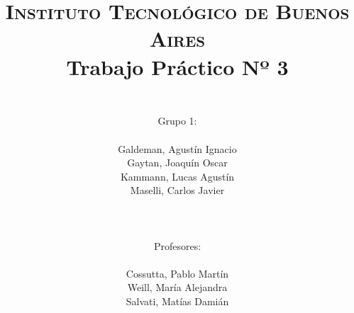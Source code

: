 



    \title{
        \normalfont \normalsize \textsc{Instituto Tecnol\'ogico de Buenos Aires} \\ [25pt]
        \huge Trabajo Pr\'actico Nº 3 \\
        \author{
            \\Grupo 1:\\\\Galdeman, Agust\'in Ignacio\\Gaytan, Joaqu\'in Oscar\\Kammann, Lucas Agust\'in\\Maselli, Carlos Javier\\ \\ \\ \\
            Profesores: \\\\ Cossutta, Pablo Mart\'in\\Weill, Mar\'ia Alejandra\\Salvati, Mat\'ias Dami\'an \\ \\ \\ 
        } 
    }

    \maketitle
    \newpage

    \tableofcontents

    \newpage
    

